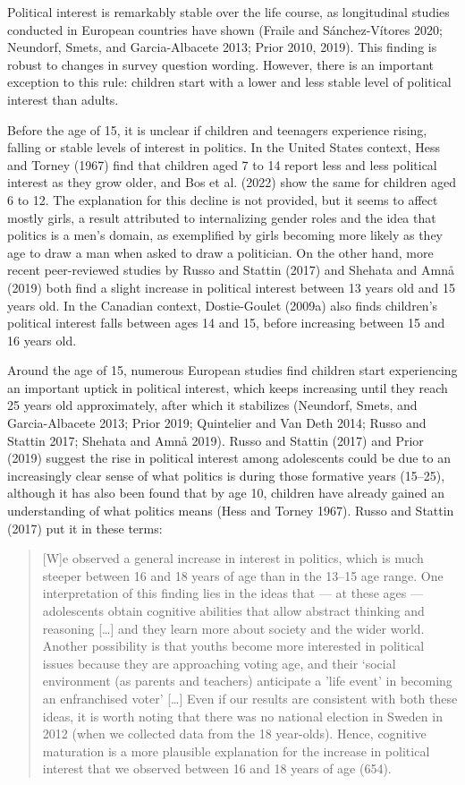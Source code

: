 \documentclass[
  letterpaper,
  DIV=11,
  numbers=noendperiod]{scrreprt}
\begin{document}
Political interest is remarkably stable over the life course, as
longitudinal studies conducted in European countries have shown (Fraile
and Sánchez-Vítores 2020; Neundorf, Smets, and Garcia-Albacete 2013;
Prior 2010, 2019). This finding is robust to changes in survey question
wording. However, there is an important exception to this rule: children
start with a lower and less stable level of political interest than
adults.

Before the age of 15, it is unclear if children and teenagers experience
rising, falling or stable levels of interest in politics. In the United
States context, Hess and Torney (1967) find that children aged 7 to 14
report less and less political interest as they grow older, and Bos et
al. (2022) show the same for children aged 6 to 12. The explanation for
this decline is not provided, but it seems to affect mostly girls, a
result attributed to internalizing gender roles and the idea that
politics is a men's domain, as exemplified by girls becoming more likely
as they age to draw a man when asked to draw a politician. On the other
hand, more recent peer-reviewed studies by Russo and Stattin (2017) and
Shehata and Amnå (2019) both find a slight increase in political
interest between 13 years old and 15 years old. In the Canadian context,
Dostie-Goulet (2009a) also finds children's political interest falls
between ages 14 and 15, before increasing between 15 and 16 years old.

Around the age of 15, numerous European studies find children start
experiencing an important uptick in political interest, which keeps
increasing until they reach 25 years old approximately, after which it
stabilizes (Neundorf, Smets, and Garcia-Albacete 2013; Prior 2019;
Quintelier and Van Deth 2014; Russo and Stattin 2017; Shehata and Amnå
2019). Russo and Stattin (2017) and Prior (2019) suggest the rise in
political interest among adolescents could be due to an increasingly
clear sense of what politics is during those formative years (15--25),
although it has also been found that by age 10, children have already
gained an understanding of what politics means (Hess and Torney 1967).
Russo and Stattin (2017) put it in these terms:

\begin{quote}
{[}W{]}e observed a general increase in interest in politics, which is
much steeper between 16 and 18 years of age than in the 13--15 age
range. One interpretation of this finding lies in the ideas that --- at
these ages --- adolescents obtain cognitive abilities that allow
abstract thinking and reasoning {[}\ldots{]} and they learn more about
society and the wider world. Another possibility is that youths become
more interested in political issues because they are approaching voting
age, and their `social environment (as parents and teachers) anticipate
a 'life event' in becoming an enfranchised voter' {[}\ldots{]} Even if
our results are consistent with both these ideas, it is worth noting
that there was no national election in Sweden in 2012 (when we collected
data from the 18 year-olds). Hence, cognitive maturation is a more
plausible explanation for the increase in political interest that we
observed between 16 and 18 years of age (654).
\end{quote}
\end{document}

